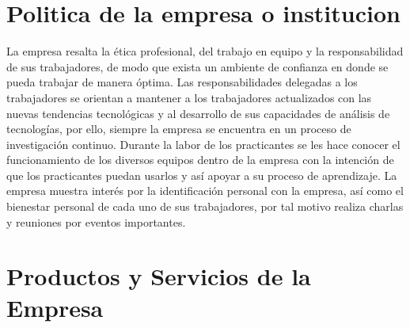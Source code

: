 \section{Politica de la empresa o institucion}
La empresa resalta la ética profesional, del trabajo en equipo y la responsabilidad de sus trabajadores, de modo que exista un ambiente de confianza en donde se pueda trabajar de manera óptima. Las responsabilidades delegadas a los trabajadores se orientan a mantener a los trabajadores actualizados con las nuevas tendencias tecnológicas y al desarrollo de sus capacidades de análisis de tecnologías, por ello, siempre la empresa se encuentra en un proceso de investigación continuo. Durante la labor de los practicantes se les hace conocer el funcionamiento de los diversos equipos dentro de la empresa con la intención de que los practicantes puedan usarlos y así apoyar a su proceso de aprendizaje. La empresa muestra interés por la identificación personal con la empresa, así como el bienestar personal de cada uno de sus trabajadores, por tal motivo realiza charlas y reuniones por eventos importantes.


\section{Productos y Servicios de la Empresa}

